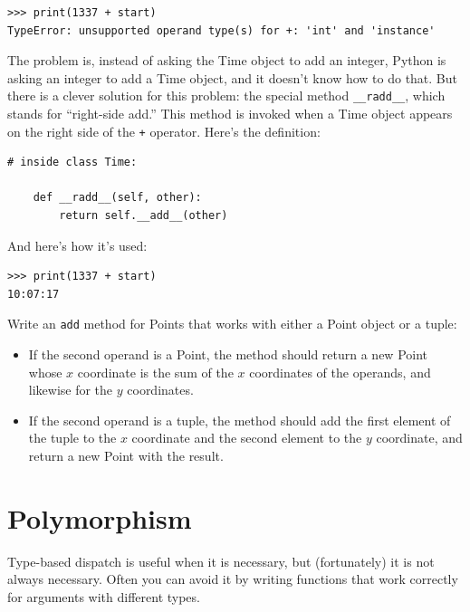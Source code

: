\documentclass[10pt]{book}
\begin{document}

\beforeverb
\begin{verbatim}
>>> print(1337 + start)
TypeError: unsupported operand type(s) for +: 'int' and 'instance'
\end{verbatim}
\afterverb
%
The problem is, instead of asking the Time object to add an integer,
Python is asking an integer to add a Time object, and it doesn't know
how to do that.  But there is a clever solution for this problem: the
special method \verb"__radd__", which stands for ``right-side add.''
This method is invoked when a Time object appears on the right side of
the {\tt +} operator.  Here's the definition:


\beforeverb
\begin{verbatim}
# inside class Time:

    def __radd__(self, other):
        return self.__add__(other)
\end{verbatim}
\afterverb
%
And here's how it's used:

\beforeverb
\begin{verbatim}
>>> print(1337 + start)
10:07:17
\end{verbatim}
\afterverb
%

\begin{ex}
Write an {\tt add} method for Points that works with either a
Point object or a tuple:  

\begin{itemize}

\item If the second operand is a Point, the method should return a new
Point whose $x$ coordinate is the sum of the $x$ coordinates of the
operands, and likewise for the $y$ coordinates.

\item If the second operand is a tuple, the method should add the
first element of the tuple to the $x$ coordinate and the second
element to the $y$ coordinate, and return a new Point with the result. 

\end{itemize}

\end{ex}

\section{Polymorphism}

Type-based dispatch is useful when it is necessary, but (fortunately)
it is not always necessary.  Often you can avoid it by writing functions
that work correctly for arguments with different types.
\end{document}
